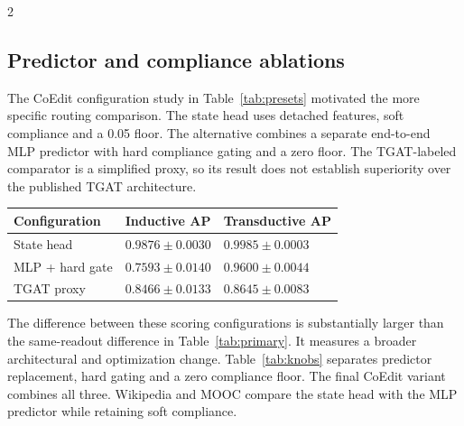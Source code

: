 \documentclass[a4paper,10pt,fleqn]{article}
\renewcommand{\small}{\fontsize{8}{12}\selectfont}
\begin{document}
\begin{multicols}{2}
\subsection{Predictor and compliance ablations}
The CoEdit configuration study in Table~\ref{tab:presets} motivated the more specific routing comparison. The state head uses detached features, soft compliance and a 0.05 floor. The alternative combines a separate end-to-end MLP predictor with hard compliance gating and a zero floor. The TGAT-labeled comparator is a simplified proxy, so its result does not establish superiority over the published TGAT architecture.

\begin{center}
\begin{minipage}{\linewidth}\centering
{}\label{tab:presets}
\small\setlength{\tabcolsep}{3pt}
\begin{tabular}{@{}lll@{}}
\toprule
Configuration & Inductive AP & Transductive AP\\ \midrule
State head & $0.9876\pm0.0030$ & $0.9985\pm0.0003$\\
MLP + hard gate & $0.7593\pm0.0140$ & $0.9600\pm0.0044$\\
TGAT proxy & $0.8466\pm0.0133$ & $0.8645\pm0.0083$\\
\bottomrule
\end{tabular}
\end{minipage}
\end{center}

The difference between these scoring configurations is substantially larger than the same-readout difference in Table~\ref{tab:primary}. It measures a broader architectural and optimization change. Table~\ref{tab:knobs} separates predictor replacement, hard gating and a zero compliance floor. The final CoEdit variant combines all three. Wikipedia and MOOC compare the state head with the MLP predictor while retaining soft compliance.


\end{multicols}
\end{document}
